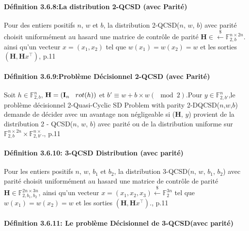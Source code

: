 \documentclass[12pt,openany]{report}
\begin{document}
\paragraph{Définition 3.6.8:La distribution 2-QCSD (avec Parité)\\}

Pour des entiers positifs $n$, $w$ et $b$, la distribution 2-QCSD($n$, $w$, $b$) avec parité choisit uniformément au hasard une matrice de contrôle de parité $\mathbf{H}\in \overset{\$}{\gets} \mathbb{F}_{2,b}^{n \times 2n}$.
ainsi qu'un vecteur $x = (x_1, x_2)$ tel que $w(x_1) = w(x_2) = w$ et les sorties $(\mathbf{H},\mathbf{H}x^{\top})$\cite{melchor2020}, p.11

\paragraph{Définition 3.6.9:Problème Décisionnel 2-QCSD (avec Parité)\\}

Soit $ h \in \mathbb{F}_{2,b}^n $, $ \mathbf{H}=\left( \mathbf{I}_n \hspace{0.3cm} rot(h) \right)$ et $ b'\equiv w +b \times w (\mod 2)$.Pour $ y \in \mathbb{F}_{2,b'}^n$,le problème décisionnel 2-Quasi-Cyclic SD Problem with parity 2-DQCSD($n$,$ w$,$ b$) demande de décider avec un avantage non négligeable si ($\mathbf{H}$, $y$) provient de la distribution 2 - QCSD($n$, $w$, $b$) avec parité ou de la distribution uniforme sur $ \mathbb{F}_{2,b}^{n\times 2n} \times  \mathbb{F}_{2,b'}^{n\times} $.\cite{melchor2020}, p.11

\paragraph{Définition 3.6.10: 3-QCSD Distribution (avec parité)\\}
Pour les entiers positifs $n$, $w$, $b_1$ et $b_2$, la distribution 3-QCSD($n$, $w$, $b_1$, $b_2$) avec parité choisit uniformément au hasard une matrice de contrôle de parité $\mathbf{H} \in \mathbb{F}_{2,b_1,b_2}^{2n \times 3n}$, 
ainsi qu'un vecteur $ x=(x_1,x_2,x_3)\overset{\$}{\gets}\mathbb{F}_{2}^{3n}$ tel que $w(x_1)= w(x_2)=w $ et les sorties $(\mathbf{H},\mathbf{H}x^{\top})$.\cite{melchor2020}, p.11
\paragraph{Définition 3.6.11: Le problème Décisionnel de 3-QCSD(avec parité)\\}
\end{document}
